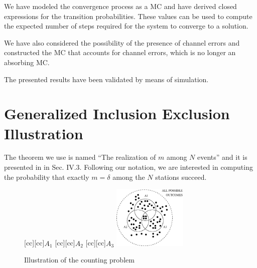 \documentclass[journal]{IEEEtran}
\begin{document}
We have modeled the convergence process as a MC and have derived closed expressions for the transition probabilities.
These values can be used to compute the expected number of steps required for the system to converge to a solution.

We have also considered the possibility of the presence of channel errors and constructed the MC that accounts for channel errors, which is no longer an absorbing MC.

The presented results have been validated by means of simulation.






%


\appendices
\section{Generalized Inclusion Exclusion Illustration}
\label{app:incl-excl-thm}
\label{app:theorem}
The theorem we use is named ``The realization of $m$ among $N$ events'' and it is presented in \cite{feller1968ipt} in Sec. IV.3.
Following our notation, we are interested in computing the probability that exactly $m=\delta$ among the $N$ stations succeed.

\begin{figure}
[cc][cc]{$A_1$}
[cc][cc]{$A_2$}
[cc][cc]{$A_3$}
\centering
\includegraphics[height=3cm]{figures/counting}
\caption{Illustration of the counting problem}
\label{fig:counting}
\end{figure}
\end{document}
